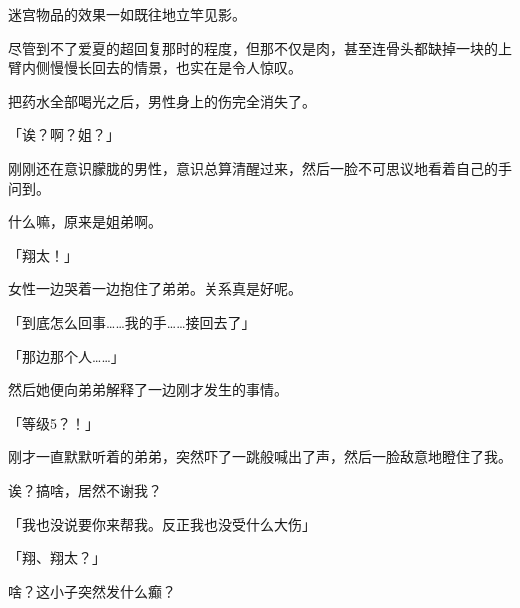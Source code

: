 迷宫物品的效果一如既往地立竿见影。

尽管到不了爱夏的超回复那时的程度，但那不仅是肉，甚至连骨头都缺掉一块的上臂内侧慢慢长回去的情景，也实在是令人惊叹。

把药水全部喝光之后，男性身上的伤完全消失了。

「诶？啊？姐？」

刚刚还在意识朦胧的男性，意识总算清醒过来，然后一脸不可思议地看着自己的手问到。

什么嘛，原来是姐弟啊。

「翔太！」

女性一边哭着一边抱住了弟弟。关系真是好呢。

「到底怎么回事……我的手……接回去了」

「那边那个人……」

然后她便向弟弟解释了一边刚才发生的事情。

「等级5？！」

刚才一直默默听着的弟弟，突然吓了一跳般喊出了声，然后一脸敌意地瞪住了我。

诶？搞啥，居然不谢我？

「我也没说要你来帮我。反正我也没受什么大伤」

「翔、翔太？」

啥？这小子突然发什么癫？

